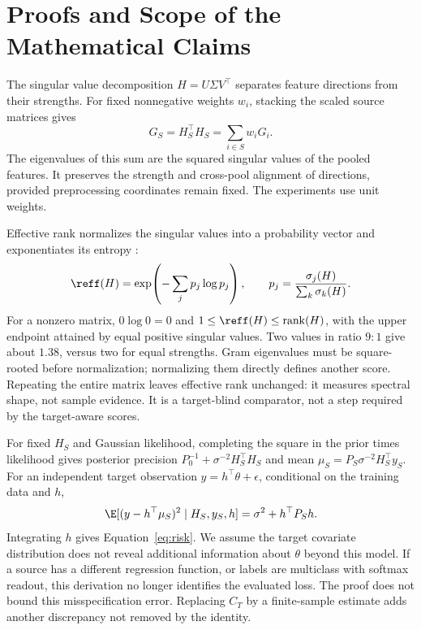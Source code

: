 \section{Proofs and Scope of the Mathematical Claims}
\label{app:proofs}
The singular value decomposition $H=U\Sigma V^\top$ separates feature directions from their strengths. For fixed nonnegative weights $w_i$, stacking the scaled source matrices gives
\begin{equation}
 G_S=H_S^\top H_S=\sum_{i\in S}w_iG_i.
 \label{eq:gram}
\end{equation}
The eigenvalues of this sum are the squared singular values of the pooled features. It preserves the strength and cross-pool alignment of directions, provided preprocessing coordinates remain fixed. The experiments use unit weights.

Effective rank normalizes the singular values into a probability vector and exponentiates its entropy \citep{roy2007}:
\begin{equation}
 \reff(H)=\exp\!\left(-\sum_j p_j\log p_j\right),\qquad
 p_j=\frac{\sigma_j(H)}{\sum_k\sigma_k(H)}.
 \label{eq:rank}
\end{equation}
For a nonzero matrix, $0\log0=0$ and $1\leq\reff(H)\leq\operatorname{rank}(H)$, with the upper endpoint attained by equal positive singular values. Two values in ratio $9:1$ give about $1.38$, versus two for equal strengths. Gram eigenvalues must be square-rooted before normalization; normalizing them directly defines another score. Repeating the entire matrix leaves effective rank unchanged: it measures spectral shape, not sample evidence. It is a target-blind comparator, not a step required by the target-aware scores.

For fixed $H_S$ and Gaussian likelihood, completing the square in the prior times likelihood gives posterior precision $P_0^{-1}+\sigma^{-2}H_S^\top H_S$ and mean $\mu_S=P_S\sigma^{-2}H_S^\top y_S$. For an independent target observation $y=h^\top\theta+\epsilon$, conditional on the training data and $h$,
\begin{equation}
 \E[(y-h^\top\mu_S)^2\mid H_S,y_S,h]=\sigma^2+h^\top P_Sh.
\end{equation}
Integrating $h$ gives Equation~\eqref{eq:risk}. We assume the target covariate distribution does not reveal additional information about $\theta$ beyond this model. If a source has a different regression function, or labels are multiclass with softmax readout, this derivation no longer identifies the evaluated loss. The proof does not bound this misspecification error. Replacing $C_T$ by a finite-sample estimate adds another discrepancy not removed by the identity.

